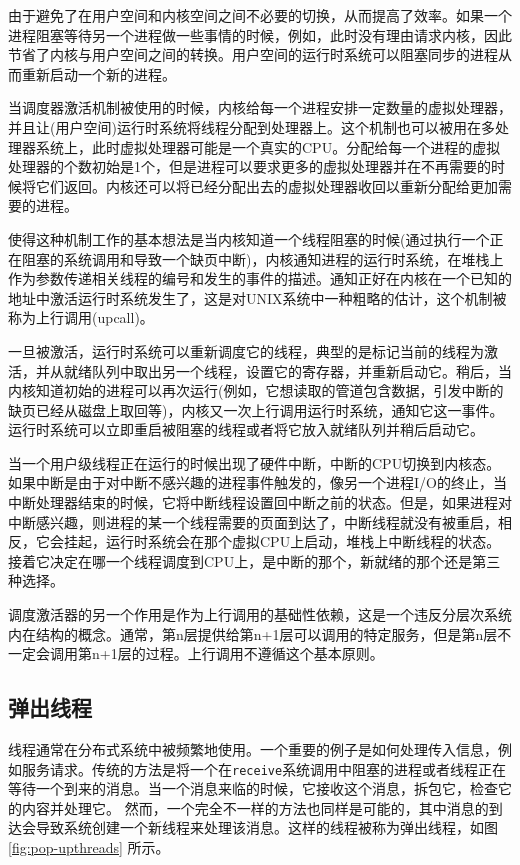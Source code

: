	由于避免了在用户空间和内核空间之间不必要的切换，从而提高了效率。如果一个进程阻塞等待另一个进程做一些事情的时候，例如，此时没有理由请求内核，因此节省了内核与用户空间之间的转换。用户空间的运行时系统可以阻塞同步的进程从而重新启动一个新的进程。
	
	当调度器激活机制被使用的时候，内核给每一个进程安排一定数量的虚拟处理器，并且让(用户空间)运行时系统将线程分配到处理器上。这个机制也可以被用在多处理器系统上，此时虚拟处理器可能是一个真实的CPU。分配给每一个进程的虚拟处理器的个数初始是1个，但是进程可以要求更多的虚拟处理器并在不再需要的时候将它们返回。内核还可以将已经分配出去的虚拟处理器收回以重新分配给更加需要的进程。
	
	使得这种机制工作的基本想法是当内核知道一个线程阻塞的时候(通过执行一个正在阻塞的系统调用和导致一个缺页中断)，内核通知进程的运行时系统，在堆栈上作为参数传递相关线程的编号和发生的事件的描述。通知正好在内核在一个已知的地址中激活运行时系统发生了，这是对UNIX系统中一种粗略的估计，这个机制被称为上行调用(upcall)。
	
	一旦被激活，运行时系统可以重新调度它的线程，典型的是标记当前的线程为激活，并从就绪队列中取出另一个线程，设置它的寄存器，并重新启动它。稍后，当内核知道初始的进程可以再次运行(例如，它想读取的管道包含数据，引发中断的缺页已经从磁盘上取回等)，内核又一次上行调用运行时系统，通知它这一事件。运行时系统可以立即重启被阻塞的线程或者将它放入就绪队列并稍后启动它。
	
	当一个用户级线程正在运行的时候出现了硬件中断，中断的CPU切换到内核态。如果中断是由于对中断不感兴趣的进程事件触发的，像另一个进程I/O的终止，当中断处理器结束的时候，它将中断线程设置回中断之前的状态。但是，如果进程对中断感兴趣，则进程的某一个线程需要的页面到达了，中断线程就没有被重启，相反，它会挂起，运行时系统会在那个虚拟CPU上启动，堆栈上中断线程的状态。接着它决定在哪一个线程调度到CPU上，是中断的那个，新就绪的那个还是第三种选择。
	
	调度激活器的另一个作用是作为上行调用的基础性依赖，这是一个违反分层次系统内在结构的概念。通常，第n层提供给第n+1层可以调用的特定服务，但是第n层不一定会调用第n+1层的过程。上行调用不遵循这个基本原则。
	
	\subsection{弹出线程}
	
	线程通常在分布式系统中被频繁地使用。一个重要的例子是如何处理传入信息，例如服务请求。传统的方法是将一个在\texttt{receive}系统调用中阻塞的进程或者线程正在等待一个到来的消息。当一个消息来临的时候，它接收这个消息，拆包它，检查它的内容并处理它。
	然而，一个完全不一样的方法也同样是可能的，其中消息的到达会导致系统创建一个新线程来处理该消息。这样的线程被称为弹出线程，如图\ref{fig:pop-upthreads} 所示。
	
